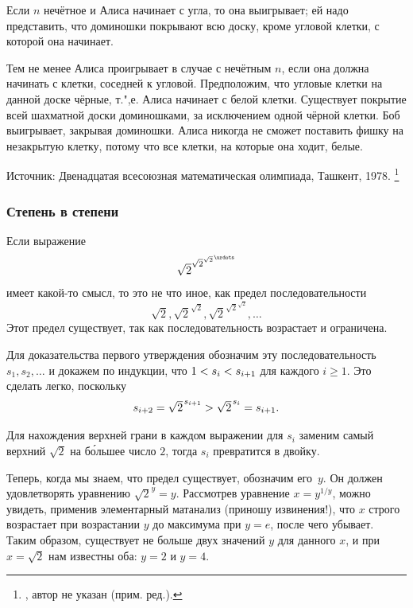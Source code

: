 \documentclass[twoside]{book}
\begin{document}
Если $n$ нечётное и Алиса начинает с угла, то она выигрывает;
ей надо представить, что доминошки покрывают всю доску, кроме угловой клетки, с которой она начинает.

Тем не менее Алиса проигрывает в случае с нечётным $n$, если она должна начинать с клетки, соседней к угловой.
Предположим, что угловые клетки на данной доске чёрные, т.",е. Алиса начинает с белой клетки.
Существует покрытие всей шахматной доски доминошками, за исключением одной чёрной клетки.
Боб выигрывает, закрывая доминошки.
Алиса
никогда не сможет поставить фишку на незакрытую клетку, потому что все клетки, на которые она ходит, белые.\heart

\medskip

{\small

Источник: Двенадцатая всесоюзная математическая олимпиада, Ташкент, 1978.%
\footnote{\cite[№262]{ВсМО}, автор не указан (прим. ред.).}

}


\subsubsection*{Степень в степени} %

Если выражение
$${\textstyle\sqrt{2}}^{{\sqrt{2}}^{{\sqrt{2}}^{\mkern2mu\urdots}}}$$
имеет какой-то смысл, то это не что иное, как предел последовательности
$${\textstyle\sqrt{2}}, {\textstyle\sqrt{2}}^{{\sqrt{2}}}, {\textstyle\sqrt{2}}^{{\sqrt{2}}^{{\sqrt{2}}}},\dots$$
Этот предел существует, так как последовательность возрастает и ограничена.

Для доказательства первого утверждения обозначим эту последовательность
$s_1, s_2,\dots$ и докажем по индукции, что $1<s_i\z<s_{i+1}$
для каждого $i\ge 1$.
Это сделать легко, поскольку \[s_{i+2}=
{\textstyle\sqrt{2}\mkern2mu}^{s_{i+1}}
>{\textstyle\sqrt{2}\mkern2mu} ^{s_{i}}
=s_{i+1}.\]

Для нахождения верхней грани в каждом выражении для $s_i$ заменим самый верхний $\sqrt{2}$ на б\'{о}льшее число $2$, тогда $s_i$ превратится в двойку.

Теперь, когда мы знаем, что предел существует, обозначим его~$y$.
Он должен удовлетворять уравнению ${\sqrt{2}}^y=y$.
Рассмотрев уравнение $x=y^{1/y}$, 
можно увидеть, применив элементарный матанализ (приношу извинения!), 
что $x$ строго возрастает при возрастании $y$ до максимума при $y=e$, после чего убывает.
Таким образом, существует не больше двух значений $y$ для данного $x$, 
и при $x=\sqrt{2}$ нам известны оба: $y=2$ и $y=4$.
\end{document}
